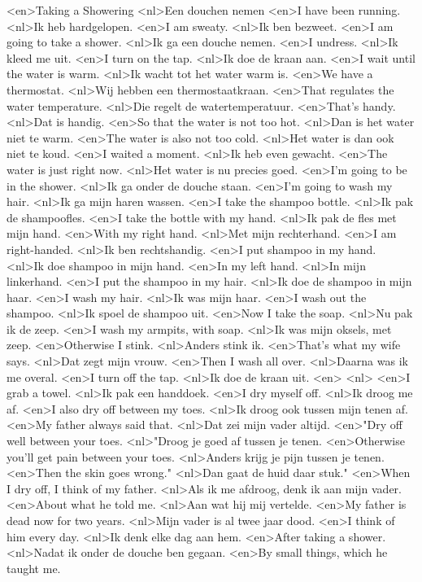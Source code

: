 <en>Taking a Showering
<nl>Een douchen nemen
<en>I have been running.
<nl>Ik heb hardgelopen.
<en>I am sweaty.
<nl>Ik ben bezweet.
<en>I am going to take a shower.
<nl>Ik ga een douche nemen.
<en>I undress.
<nl>Ik kleed me uit.
<en>I turn on the tap.
<nl>Ik doe de kraan aan.
<en>I wait until the water is warm.
<nl>Ik wacht tot het water warm is.
<en>We have a thermostat.
<nl>Wij hebben een thermostaatkraan.
<en>That regulates the water temperature.
<nl>Die regelt de watertemperatuur.
<en>That's handy.
<nl>Dat is handig.
<en>So that the water is not too hot.
<nl>Dan is het water niet te warm.
<en>The water is also not too cold.
<nl>Het water is dan ook niet te koud.
<en>I waited a moment.
<nl>Ik heb even gewacht.
<en>The water is just right now.
<nl>Het water is nu precies goed.
<en>I'm going to be in the shower.
<nl>Ik ga onder de douche staan.
<en>I'm going to wash my hair.
<nl>Ik ga mijn haren wassen.
<en>I take the shampoo bottle.
<nl>Ik pak de shampoofles.
<en>I take the bottle with my hand.
<nl>Ik pak de fles met mijn hand.
<en>With my right hand.
<nl>Met mijn rechterhand.
<en>I am right-handed.
<nl>Ik ben rechtshandig.
<en>I put shampoo in my hand.
<nl>Ik doe shampoo in mijn hand.
<en>In my left hand.
<nl>In mijn linkerhand.
<en>I put the shampoo in my hair.
<nl>Ik doe de shampoo in mijn haar.
<en>I wash my hair.
<nl>Ik was mijn haar.
<en>I wash out the shampoo.
<nl>Ik spoel de shampoo uit.
<en>Now I take the soap.
<nl>Nu pak ik de zeep.
<en>I wash my armpits, with soap.
<nl>Ik was mijn oksels, met zeep.
<en>Otherwise I stink.
<nl>Anders stink ik.
<en>That's what my wife says.
<nl>Dat zegt mijn vrouw.
<en>Then I wash all over.
<nl>Daarna was ik me overal.
<en>I turn off the tap.
<nl>Ik doe de kraan uit.
<en>
<nl>
<en>I grab a towel.
<nl>Ik pak een handdoek.
<en>I dry myself off.
<nl>Ik droog me af.
<en>I also dry off between my toes.
<nl>Ik droog ook tussen mijn tenen af.
<en>My father always said that.
<nl>Dat zei mijn vader altijd.
<en>"Dry off well between your toes.
<nl>"Droog je goed af tussen je tenen.
<en>Otherwise you'll get pain between your toes.
<nl>Anders krijg je pijn tussen je tenen.
<en>Then the skin goes wrong."
<nl>Dan gaat de huid daar stuk."
<en>When I dry off, I think of my father.
<nl>Als ik me afdroog, denk ik  aan mijn vader.
<en>About what he told me.
<nl>Aan wat hij mij vertelde.
<en>My father is dead now for two years.
<nl>Mijn vader is al twee jaar dood.
<en>I think of him every day.
<nl>Ik denk elke dag aan hem.
<en>After taking a shower.
<nl>Nadat  ik onder de douche ben gegaan.
<en>By small things, which he taught me.
